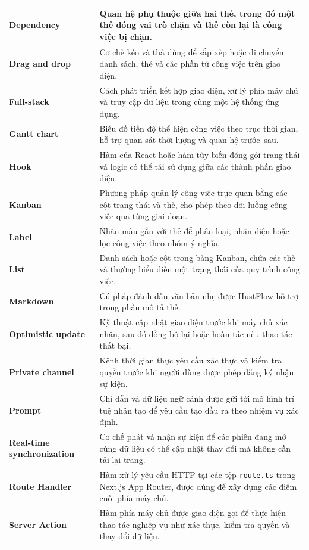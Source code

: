 \documentclass[../DoAn.tex]{subfiles}
\begin{document}
\begin{longtable}{|p{4.2cm}|p{9.7cm}|}
    \textbf{Dependency} & Quan hệ phụ thuộc giữa hai thẻ, trong đó một thẻ đóng vai trò chặn và thẻ còn lại là công việc bị chặn. \\ \hline
    \textbf{Drag and drop} & Cơ chế kéo và thả dùng để sắp xếp hoặc di chuyển danh sách, thẻ và các phần tử công việc trên giao diện. \\ \hline
    \textbf{Full-stack} & Cách phát triển kết hợp giao diện, xử lý phía máy chủ và truy cập dữ liệu trong cùng một hệ thống ứng dụng. \\ \hline
    \textbf{Gantt chart} & Biểu đồ tiến độ thể hiện công việc theo trục thời gian, hỗ trợ quan sát thời lượng và quan hệ trước--sau. \\ \hline
    \textbf{Hook} & Hàm của React hoặc hàm tùy biến đóng gói trạng thái và logic có thể tái sử dụng giữa các thành phần giao diện. \\ \hline
    \textbf{Kanban} & Phương pháp quản lý công việc trực quan bằng các cột trạng thái và thẻ, cho phép theo dõi luồng công việc qua từng giai đoạn. \\ \hline
    \textbf{Label} & Nhãn màu gắn với thẻ để phân loại, nhận diện hoặc lọc công việc theo nhóm ý nghĩa. \\ \hline
    \textbf{List} & Danh sách hoặc cột trong bảng Kanban, chứa các thẻ và thường biểu diễn một trạng thái của quy trình công việc. \\ \hline
    \textbf{Markdown} & Cú pháp đánh dấu văn bản nhẹ được HustFlow hỗ trợ trong phần mô tả thẻ. \\ \hline
    \textbf{Optimistic update} & Kỹ thuật cập nhật giao diện trước khi máy chủ xác nhận, sau đó đồng bộ lại hoặc hoàn tác nếu thao tác thất bại. \\ \hline
    \textbf{Private channel} & Kênh thời gian thực yêu cầu xác thực và kiểm tra quyền trước khi người dùng được phép đăng ký nhận sự kiện. \\ \hline
    \textbf{Prompt} & Chỉ dẫn và dữ liệu ngữ cảnh được gửi tới mô hình trí tuệ nhân tạo để yêu cầu tạo đầu ra theo nhiệm vụ xác định. \\ \hline
    \textbf{Real-time synchronization} & Cơ chế phát và nhận sự kiện để các phiên đang mở cùng dữ liệu có thể cập nhật thay đổi mà không cần tải lại trang. \\ \hline
    \textbf{Route Handler} & Hàm xử lý yêu cầu HTTP tại các tệp \texttt{route.ts} trong Next.js App Router, được dùng để xây dựng các điểm cuối phía máy chủ. \\ \hline
    \textbf{Server Action} & Hàm phía máy chủ được giao diện gọi để thực hiện thao tác nghiệp vụ như xác thực, kiểm tra quyền và thay đổi dữ liệu. \\ \hline

\end{longtable}
\end{document}
